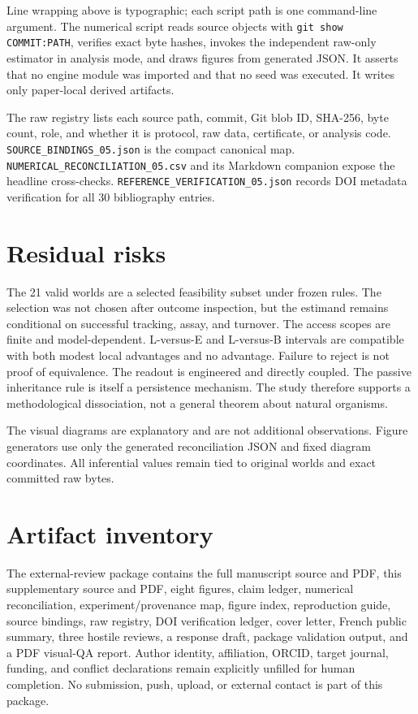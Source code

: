 \documentclass[10pt]{article}
\newcommand{\code}[1]{\texttt{#1}}
\begin{document}
Line wrapping above is typographic; each script path is one command-line argument. The numerical script reads source objects with \code{git show COMMIT:PATH}, verifies exact byte hashes, invokes the independent raw-only estimator in analysis mode, and draws figures from generated JSON. It asserts that no engine module was imported and that no seed was executed. It writes only paper-local derived artifacts.

The raw registry lists each source path, commit, Git blob ID, SHA-256, byte count, role, and whether it is protocol, raw data, certificate, or analysis code. \code{SOURCE\_BINDINGS\_05.json} is the compact canonical map. \code{NUMERICAL\_RECONCILIATION\_05.csv} and its Markdown companion expose the headline cross-checks. \code{REFERENCE\_VERIFICATION\_05.json} records DOI metadata verification for all 30 bibliography entries.

\section{Residual risks}

The 21 valid worlds are a selected feasibility subset under frozen rules. The selection was not chosen after outcome inspection, but the estimand remains conditional on successful tracking, assay, and turnover. The access scopes are finite and model-dependent. L-versus-E and L-versus-B intervals are compatible with both modest local advantages and no advantage. Failure to reject is not proof of equivalence. The readout is engineered and directly coupled. The passive inheritance rule is itself a persistence mechanism. The study therefore supports a methodological dissociation, not a general theorem about natural organisms.

The visual diagrams are explanatory and are not additional observations. Figure generators use only the generated reconciliation JSON and fixed diagram coordinates. All inferential values remain tied to original worlds and exact committed raw bytes.

\section{Artifact inventory}

The external-review package contains the full manuscript source and PDF, this supplementary source and PDF, eight figures, claim ledger, numerical reconciliation, experiment/provenance map, figure index, reproduction guide, source bindings, raw registry, DOI verification ledger, cover letter, French public summary, three hostile reviews, a response draft, package validation output, and a PDF visual-QA report. Author identity, affiliation, ORCID, target journal, funding, and conflict declarations remain explicitly unfilled for human completion. No submission, push, upload, or external contact is part of this package.
\end{document}
